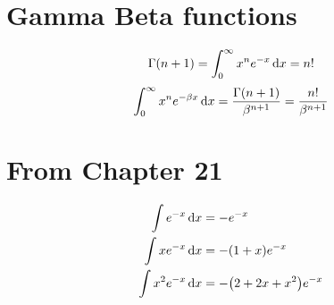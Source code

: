 \section{Gamma Beta functions}
\begin{equation}
	\Gamma\qty(n+1) = \int_0^\infty x^n e^{-x} \dd{x} = n!
\end{equation}
\begin{align}
\int_{0}^{\infty} x^n e^{-\beta x} \dd{x} = \frac{\Gamma\qty(n+1)}{\beta^{n+1}} = \frac{n!}{\beta^{n+1}}
\end{align}


\section{From Chapter 21}
\begin{align}
	\int e^{-x} \dd{x} &= - e^{-x} \\
	\int x e^{-x} \dd{x} &= - \qty(1 + x) e^{-x} \\
	\int x^2 e^{-x} \dd{x} &= -\qty(2 + 2 x + x^2)  e^{-x}
\end{align}